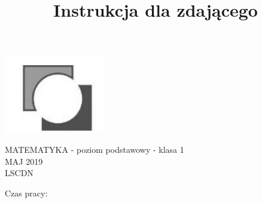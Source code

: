 \documentclass[10pt]{article}
\title{Instrukcja dla zdającego }
\author{}
\date{}
\begin{document}
\maketitle
\begin{center}
\includegraphics[max width=\textwidth]{2024_11_21_23d228cacd5e4a9a3f86g-01}
\end{center}

MATEMATYKA - poziom podstawowy - klasa 1\\
MAJ 2019\\
LSCDN

Czas pracy:
\end{document}
